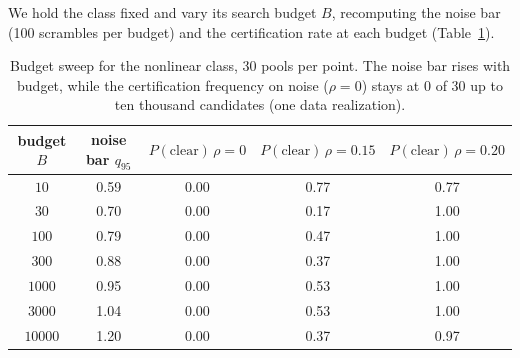 \documentclass[11pt]{article}
\begin{document}
We hold the class fixed and vary its search budget $B$, recomputing the noise bar (100 scrambles per
budget) and the certification rate at each budget (Table~\ref{tab:capacity}).

\begin{table}[htbp]
\centering
\caption{Budget sweep for the nonlinear class, 30 pools per point. The noise bar rises with budget,
while the certification frequency on noise ($\rho=0$) stays at 0 of 30 up to ten thousand candidates
(one data realization).}
\label{tab:capacity}
\small
\begin{tabular}{c c c c c}
\toprule
budget $B$ & noise bar $q_{95}$ & $P(\text{clear})\,\rho{=}0$ & $P(\text{clear})\,\rho{=}0.15$ & $P(\text{clear})\,\rho{=}0.20$ \\
\midrule
$10$     & 0.59 & 0.00 & 0.77 & 0.77 \\
$30$     & 0.70 & 0.00 & 0.17 & 1.00 \\
$100$    & 0.79 & 0.00 & 0.47 & 1.00 \\
$300$    & 0.88 & 0.00 & 0.37 & 1.00 \\
$1000$   & 0.95 & 0.00 & 0.53 & 1.00 \\
$3000$   & 1.04 & 0.00 & 0.53 & 1.00 \\
$10000$  & 1.20 & 0.00 & 0.37 & 0.97 \\
\bottomrule
\end{tabular}
\end{table}
\end{document}
